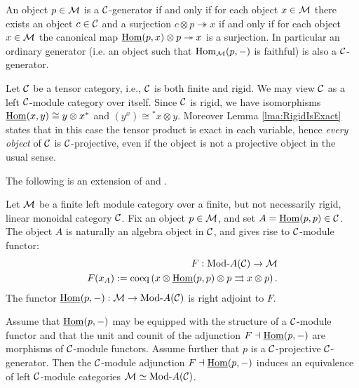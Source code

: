 \documentclass{amsart}
\begin{document}
\begin{remark}
	An object $p \in \mathcal M$ is a $\mathcal C$-generator if and only if for each object $x \in \mathcal M$ there exists an object $c \in \mathcal C$ and a surjection $c \otimes p \twoheadrightarrow x$ if and only if for each object $x \in \mathcal M$ the canonical map $\operatorname{\underline{Hom}}(p,x) \otimes p \twoheadrightarrow x$ is a surjection. In particular an ordinary generator (i.e. an object such that $\operatorname{Hom}_\mathcal M(p,-)$ is faithful) is also a $\mathcal C$-generator. 
\end{remark}

\begin{example} \label{ex:rigid_all_C-proj}
	Let $\mathcal C$ be a tensor category, i.e., $\mathcal C$ is both finite and rigid. We may view $\mathcal C$ as a left $\mathcal C$-module category over itself. Since $\mathcal C$ is rigid, we have isomorphisms $\operatorname{\underline{Hom}}(x,y) \cong y \otimes x^*$ and $(y^x) \cong {}^*x \otimes y$. Moreover Lemma \ref{lma:RigidIsExact} states that in this case the tensor product is exact in each variable, hence {\em every object} of $\mathcal C$ is $\mathcal C$-projective, even if the object is not a projective object in the usual sense. %
\end{example}

The following is an extension of \cite[Thm 2.11.2]{EGNO} and \cite[Thm 1]{MR1976459}.

\begin{theorem} \label{thm:C-module-Embedding} %
	Let $\mathcal M$ be a finite left module category over a finite, but not necessarily rigid, linear monoidal category $\mathcal C$. Fix an object $p \in \mathcal M$, and set $A = \operatorname{\underline{Hom}}(p,p) \in \mathcal C$. The object $A$ is naturally an algebra object in $\mathcal C$, and gives rise to $\mathcal C$-module functor:
	\begin{align*}
		F:   \Mod{}{A}(\cC) \to \cM \\
		F(x_A) := \coeq \left( x \otimes \IHom(p,p) \otimes p \rightrightarrows x \otimes p \right).
	\end{align*}
The functor $\IHom(p,-): \cM \to \Mod{}{A}(\cC)$ is right adjoint to $F$. 

Assume that $\operatorname{\underline{Hom}}(p,-)$ may be equipped with the structure of a $\mathcal C$-module functor and that the unit and counit of the adjunction $F \dashv \operatorname{\underline{Hom}}(p,-)$ are morphisms of $\mathcal C$-module functors. Assume further that $p$ is a $\mathcal C$-projective $\mathcal C$-generator.  Then the $\mathcal C$-module adjunction  $F \dashv \operatorname{\underline{Hom}}(p,-)$
	induces an equivalence of left $\mathcal C$-module categories $\cM \simeq \Mod{}{A}(\cC)$. 
\end{theorem}
\end{document}
